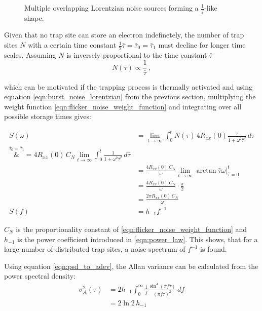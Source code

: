 \begin{figure}[hb]
    \centering
    
    \caption{Multiple overlapping Lorentzian noise sources forming a $\frac 1 f$-like shape.}
    \label{fig:flicker_noise_evelope}
\end{figure}

Given that no trap site can store an electron indefinetely, the number of trap sites $N$ with a certain time constant $\frac 1 2 \bar \tau = \bar \tau_0 = \bar \tau_1$ must decline for longer time scales. Assuming $N$ is inversely proportional to the time constant $\bar \tau$
\begin{equation}
    N(\tau) \propto \frac{1}{\bar \tau}\,, \label{eqn:flicker_noise_weight_function}
\end{equation}

which can be motivated if the trapping process is thermally activated \cite{1_f_noise_motivation} and using equation \ref{eqn:burst_noise_lorentzian} from the previous section, multiplying the weight function \ref{eqn:flicker_noise_weight_function} and integrating over all possible storage times gives:

\begin{align}
    S(\omega) &= \lim_{t \to \infty} \int_0^t N(\bar \tau) \, 4 R_{xx}(0) \frac{\bar \tau}{1 + \omega^2 \bar \tau^2} \, d\bar\tau \nonumber\\
    \overset{\bar \tau_0 = \bar \tau_1}&{=} 4 R_{xx}(0)\, C_N \lim_{t \to \infty} \int_0^t \frac{1}{1 + \omega^2 \bar\tau^2} \, d\bar\tau \nonumber\\
    &= \frac{4 R_{xx}(0)\, C_N}{\omega} \lim_{t \to \infty}  \arctan{\bar\tau \omega} \Big|_{\bar\tau=0}^t \nonumber\\
    &= \frac{4 R_{xx}(0)\, C_N}{\omega} \cdot \frac{\pi}{2} \nonumber\\
    &= \frac{2 \pi R_{xx}(0)\, C_N}{\omega}\\
    S(f) &= h_{-1} f^{-1}
\end{align}

$C_N$ is the proportionality constant of \ref{eqn:flicker_noise_weight_function} and $h_{-1}$ is the power coefficient introduced in \ref{eqn:power_law}. This shows, that for a large number of distributed trap sites, a noise spectrum of $f^{-1}$ is found.

Using equation \ref{eqn:psd_to_adev}, the Allan variance can be calculated from the power spectral density:
\begin{align}
    \sigma_A^2(\tau) &= 2 h_{-1} \int_0^\infty \frac{1}{f} \frac{\sin^4\left( \pi f \tau \right)}{(\pi f \tau)^2}\,df \nonumber\\
    &=2 \ln 2 \, h_{-1}
\end{align}


